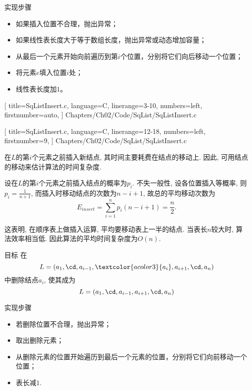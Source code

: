 \begin{frame}[fragile] 
\textcolor{acolor5}{实现步骤}
\begin{itemize}
\item
如果插入位置不合理，抛出异常；
\item
如果线性表长度大于等于数组长度，抛出异常或动态增加容量；
\item
从最后一个元素开始向前遍历到第$i$个位置，分别将它们向后移动一个位置；
\item
将元素$e$填入位置$i$处；
\item
线性表长度加$1$。
\end{itemize}

\end{frame}

\begin{frame}[fragile] 

[
title=SqListInsert.c,
language=C,
linerange={3-10},
numbers=left,
firstnumber=auto,
]
{Chapters/Ch02/Code/SqList/SqListInsert.c}
\end{frame}

\begin{frame}[fragile] 

[
title=SqListInsert.c,
language=C,
linerange={12-18},
numbers=left,
firstnumber=9,
]
{Chapters/Ch02/Code/SqList/SqListInsert.c}
\end{frame}

\begin{frame} 
在$L$的第$i$个元素之前插入新结点,  其时间主要耗费在结点的移动上. 因此,  可用结点的移动来估计算法的时间复杂度.  \vspace{0.1in}

设在$L$的第$i$个元素之前插入结点的概率为$p_i$. 不失一般性,  设各位置插入等概率,  则$p_i=\frac1{n+1}$,  而插入时移动结点的次数为$n-i+1$,  故总的平均移动次数为
$$
E_{insert}=\sum_{i=1}^n p_i (n-i+1)=\frac n2.
$$ 

这表明,  在顺序表上做插入运算,  平均要移动表上一半的结点. 当表长$n$较大时,  算法效率相当低. 因此算法的平均时间复杂度为$O(n)$. 
\end{frame}

\begin{frame}
\textcolor{acolor5}{目标}
在
$$
L=(a_1,\cd,a_{i-1},\textcolor{acolor3}{a_i},a_{i+1},\cd,a_n)
$$
中删除结点$a_i$,  使其成为 
$$
L=(a_1,\cd,a_{i-1},a_{i+1},\cd,a_n)
$$
\end{frame}

\begin{frame}  
\textcolor{acolor5}{实现步骤}
\begin{itemize}
\item
若删除位置不合理，抛出异常；
\item
取出删除元素；
\item
从删除元素的位置开始遍历到最后一个元素的位置，分别将它们向前移动一个位置；
\item
表长减$1$.
\end{itemize}
\end{frame}


